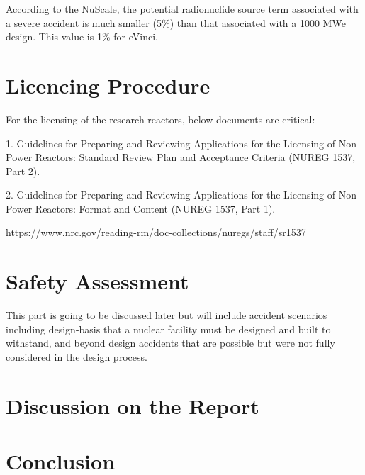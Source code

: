\documentclass[10pt,a4paper]{article}
\begin{document}
According to the NuScale, the potential radionuclide source term associated with a severe accident is much smaller (5\%) than that associated with a 1000 MWe design. This value is 1\% for eVinci. 

\section{Licencing Procedure}
For the licensing of the research reactors, below documents are critical:

1. Guidelines for Preparing and Reviewing Applications for the Licensing of Non-Power Reactors: Standard Review Plan and Acceptance Criteria (NUREG 1537, Part 2).

2. Guidelines for Preparing and Reviewing Applications for the Licensing of Non-Power Reactors: Format and Content (NUREG 1537, Part 1). 


https://www.nrc.gov/reading-rm/doc-collections/nuregs/staff/sr1537




\section{Safety Assessment}
This part is going to be discussed later but will include accident scenarios including design-basis that a nuclear facility must be designed and built to withstand, and beyond design accidents that are possible but were not fully considered in the design process.

\section{Discussion on the Report}


\section{Conclusion}
\end{document}
